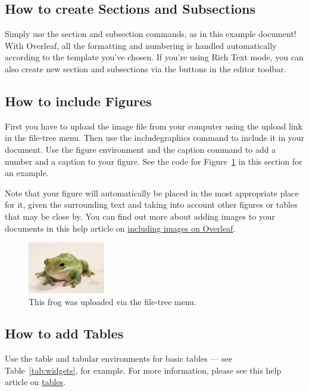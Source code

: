 \subsection{How to create Sections and Subsections}\label{subsec:how-to-create-sections-and-subsections}

Simply use the section and subsection commands, as in this example document!
With Overleaf, all the formatting and numbering is handled automatically according to the template you've chosen.
If you're using Rich Text mode, you can also create new section and subsections via the buttons in the editor toolbar.

\subsection{How to include Figures}\label{subsec:how-to-include-figures}

First you have to upload the image file from your computer using the upload link in the file-tree menu.
Then use the includegraphics command to include it in your document.
Use the figure environment and the caption command to add a number and a caption to your figure.
See the code for Figure~\ref{fig:frog} in this section for an example.

Note that your figure will automatically be placed in the most appropriate place for it, given the surrounding text and taking into account other figures or tables that may be close by.
You can find out more about adding images to your documents in this help article on \href{https://www.overleaf.com/learn/how-to/Including_images_on_Overleaf}{including images on Overleaf}.

\begin{figure}
\centering
\includegraphics[width=0.3\textwidth]{frog}
\caption{\label{fig:frog}This frog was uploaded via the file-tree menu.}
\end{figure}

\subsection{How to add Tables}\label{subsec:how-to-add-tables}

Use the table and tabular environments for basic tables --- see Table~\ref{tab:widgets}, for example.
For more information, please see this help article on \href{https://www.overleaf.com/learn/latex/tables}{tables}.

